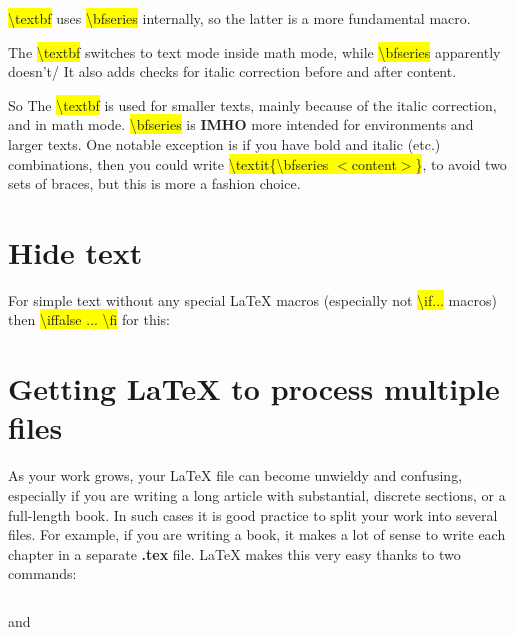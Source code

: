 \colorbox{yellow}{\textbackslash textbf} uses \colorbox{yellow}{\textbackslash bfseries} internally, so the latter is a more fundamental macro.

The \colorbox{yellow}{\textbackslash textbf} switches to text mode inside math mode, while \colorbox{yellow}{\textbackslash bfseries} apparently doesn't/ It also adds checks for italic correction before and after content.

So The \colorbox{yellow}{\textbackslash textbf} is used for smaller texts, mainly because of the italic correction, and in math mode. \colorbox{yellow}{\textbackslash bfseries} is \textbf{IMHO} more intended for environments and larger texts. One notable exception is if you have bold and italic (etc.) combinations, then you could write \colorbox{yellow}{\textbackslash textit\{\textbackslash bfseries $ < $content$ > $\}}, to avoid two sets of braces, but this is more a fashion choice.

\section{Hide text}
For simple text without any special \LaTeX{} macros (especially not \colorbox{yellow}{\textbackslash if...} macros) then \colorbox{yellow}{\textbackslash iffalse ... \textbackslash fi} for this:

\noindent
{}
		
\section{Getting \LaTeX{} to process multiple files}
As your work grows, your \LaTeX{} file can become unwieldy and confusing, especially if you are writing a long article with substantial, discrete sections, or a full-length book. In such cases it is good practice to split your work into several files. For example, if you are writing a book, it makes a lot of sense to write each chapter in a separate \textbf{.tex} file. \LaTeX{} makes this very easy thanks to two commands:

\begin{lstlisting}[language={[LaTeX]TeX}]

\end{lstlisting}

and 

